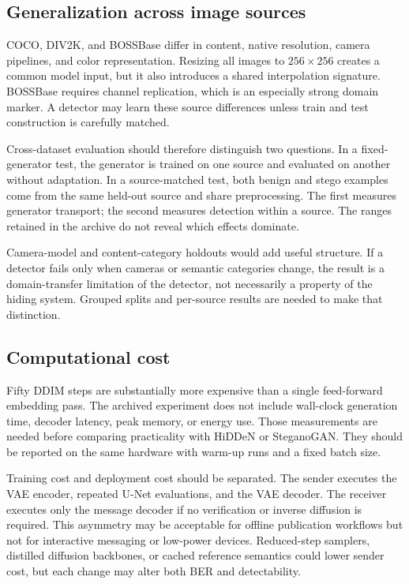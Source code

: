 \documentclass[pdflatex,sn-mathphys-num]{sn-jnl}
\begin{document}
\subsection{Generalization across image sources}

COCO, DIV2K, and BOSSBase differ in content, native resolution, camera pipelines, and color representation. Resizing all images to $256\times256$ creates a common model input, but it also introduces a shared interpolation signature. BOSSBase requires channel replication, which is an especially strong domain marker. A detector may learn these source differences unless train and test construction is carefully matched.

Cross-dataset evaluation should therefore distinguish two questions. In a fixed-generator test, the generator is trained on one source and evaluated on another without adaptation. In a source-matched test, both benign and stego examples come from the same held-out source and share preprocessing. The first measures generator transport; the second measures detection within a source. The ranges retained in the archive do not reveal which effects dominate.

Camera-model and content-category holdouts would add useful structure. If a detector fails only when cameras or semantic categories change, the result is a domain-transfer limitation of the detector, not necessarily a property of the hiding system. Grouped splits and per-source results are needed to make that distinction.

\subsection{Computational cost}

Fifty DDIM steps are substantially more expensive than a single feed-forward embedding pass. The archived experiment does not include wall-clock generation time, decoder latency, peak memory, or energy use. Those measurements are needed before comparing practicality with HiDDeN or SteganoGAN. They should be reported on the same hardware with warm-up runs and a fixed batch size.

Training cost and deployment cost should be separated. The sender executes the VAE encoder, repeated U-Net evaluations, and the VAE decoder. The receiver executes only the message decoder if no verification or inverse diffusion is required. This asymmetry may be acceptable for offline publication workflows but not for interactive messaging or low-power devices. Reduced-step samplers, distilled diffusion backbones, or cached reference semantics could lower sender cost, but each change may alter both BER and detectability.
\end{document}
